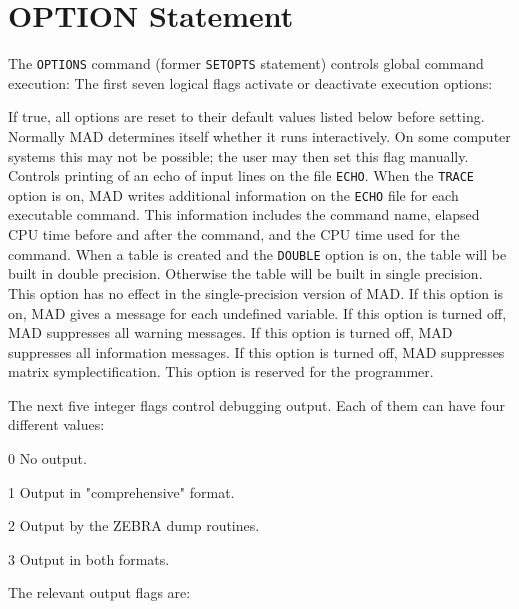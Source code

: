\section{OPTION Statement}
\label{S-OPTION}
The {\tt OPTIONS} command (former {\tt SETOPTS} statement)
controls global command execution:
The first seven logical flags activate or deactivate execution options:
\begin{mylist}
If true, all options are reset to their default values listed below
before setting.
Normally MAD determines itself whether it runs interactively.
On some computer systems this may not be possible;
the user may then set this flag manually.
Controls printing of an echo of input lines on the file {\tt ECHO}.
When the {\tt TRACE} option is on,
MAD writes additional information on the
{\tt ECHO} file for each executable command. This information includes
the command name, elapsed CPU time before and after the command,
and the CPU time used for the command.
When a table is created
and the {\tt DOUBLE} option is on,
the table will be built in double precision.
Otherwise the table will be built in single precision.
This option has no effect in the single-precision version of MAD.
If this option is on, MAD gives a message for each undefined variable.
If this option is turned off, MAD suppresses all warning messages.
If this option is turned off, MAD suppresses all information messages. 
If this option is turned off, MAD suppresses matrix symplectification.
This option is reserved for the programmer.
\end{mylist}
The next five integer flags control debugging output. Each of them
can have four different values:
\begin{mylist}
\item[0]
No output.
\item[1]
Output in "comprehensive" format.
\item[2]
Output by the ZEBRA dump routines.
\item[3]
Output in both formats.
\end{mylist}
The relevant output flags are:
